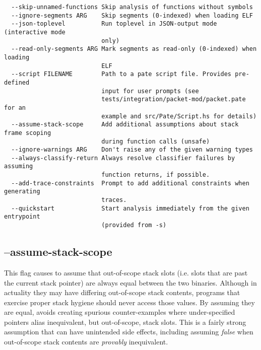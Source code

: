 \begin{verbatim}
  --skip-unnamed-functions Skip analysis of functions without symbols
  --ignore-segments ARG    Skip segments (0-indexed) when loading ELF
  --json-toplevel          Run toplevel in JSON-output mode (interactive mode
                           only)
  --read-only-segments ARG Mark segments as read-only (0-indexed) when loading
                           ELF
  --script FILENAME        Path to a pate script file. Provides pre-defined
                           input for user prompts (see
                           tests/integration/packet-mod/packet.pate for an
                           example and src/Pate/Script.hs for details)
  --assume-stack-scope     Add additional assumptions about stack frame scoping
                           during function calls (unsafe)
  --ignore-warnings ARG    Don't raise any of the given warning types
  --always-classify-return Always resolve classifier failures by assuming
                           function returns, if possible.
  --add-trace-constraints  Prompt to add additional constraints when generating
                           traces.
  --quickstart             Start analysis immediately from the given entrypoint
                           (provided from -s)
\end{verbatim}

\subsection{--assume-stack-scope}

This flag causes \pate{} to assume that out-of-scope stack slots 
(i.e. slots that are past the current stack pointer) are always equal between
the two binaries.
Although in actuality they may have differing out-of-scope stack
contents, programs that exercise proper stack hygiene should never
access those values. By assuming they are equal, \pate{} avoids 
creating spurious counter-examples where under-specified pointers
alias inequivalent, but out-of-scope, stack slots.
This is a fairly strong assumption that can have unintended side effects,
including assuming \emph{false} when out-of-scope stack contents are
\emph{provably} inequivalent.


